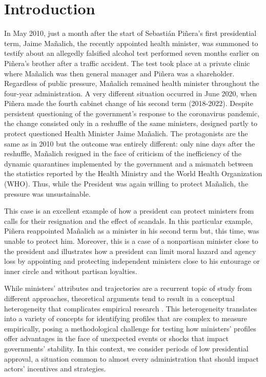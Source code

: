 \documentclass[12pt,halfline,a4paper]{ouparticle}
\begin{document}

\maketitle

\section{Introduction}
\label{sec1}

In May 2010, just a month after the start of Sebasti\'an Pi\~nera’s first presidential term, Jaime Ma\~nalich, the recently appointed health minister, was summoned to testify about an allegedly falsified alcohol test performed seven months earlier on Pi\~nera’s brother after a traffic accident. The test took place at a private clinic where Ma\~nalich was then general manager and Pi\~nera was a shareholder. Regardless of public pressure, Ma\~nalich remained health minister throughout the four-year administration. A very different situation occurred in June 2020, when Pi\~nera made the fourth cabinet change of his second term (2018-2022). Despite persistent questioning of the government’s response to the coronavirus pandemic, the change consisted only in a reshuffle of the same ministers, designed partly to protect questioned Health Minister Jaime Ma\~nalich. The protagonists are the same as in 2010 but the outcome was entirely different: only nine days after the reshuffle, Ma\~nalich resigned in the face of criticism of the inefficiency of the dynamic quarantines implemented by the government and a mismatch between the statistics reported by the Health Ministry and the World Health Organization (WHO). Thus, while the President was again willing to protect Ma\~nalich, the pressure was unsustainable.

This case is an excellent example of how a president can protect ministers from calls for their resignation and the effect of scandals. In this particular example, Pi\~nera reappointed Ma\~nalich as a minister in his second term but, this time, was unable to protect him. Moreover, this is a case of a nonpartisan minister close to the president and illustrates how a president can limit moral hazard and agency loss by appointing and protecting independent ministers close to his entourage or inner circle and without partisan loyalties.

While ministers’ attributes and trajectories are a recurrent topic of study from different approaches, theoretical arguments tend to result in a conceptual heterogeneity that complicates empirical research \citep{Camerlo2018}. This heterogeneity translates into a variety of concepts for identifying profiles that are complex to measure empirically, posing a methodological challenge for testing how ministers’ profiles offer advantages in the face of unexpected events or shocks that impact governments’ stability. In this context, we consider periods of low presidential approval, a situation common to almost every administration that should impact actors’ incentives and strategies. 
\end{document}

